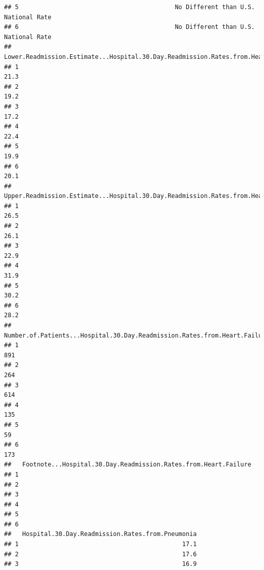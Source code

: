 \documentclass[
]{article}
\begin{document}
\begin{verbatim}
## 5                                           No Different than U.S. National Rate
## 6                                           No Different than U.S. National Rate
##   Lower.Readmission.Estimate...Hospital.30.Day.Readmission.Rates.from.Heart.Failure
## 1                                                                              21.3
## 2                                                                              19.2
## 3                                                                              17.2
## 4                                                                              22.4
## 5                                                                              19.9
## 6                                                                              20.1
##   Upper.Readmission.Estimate...Hospital.30.Day.Readmission.Rates.from.Heart.Failure
## 1                                                                              26.5
## 2                                                                              26.1
## 3                                                                              22.9
## 4                                                                              31.9
## 5                                                                              30.2
## 6                                                                              28.2
##   Number.of.Patients...Hospital.30.Day.Readmission.Rates.from.Heart.Failure
## 1                                                                       891
## 2                                                                       264
## 3                                                                       614
## 4                                                                       135
## 5                                                                        59
## 6                                                                       173
##   Footnote...Hospital.30.Day.Readmission.Rates.from.Heart.Failure
## 1                                                                
## 2                                                                
## 3                                                                
## 4                                                                
## 5                                                                
## 6                                                                
##   Hospital.30.Day.Readmission.Rates.from.Pneumonia
## 1                                             17.1
## 2                                             17.6
## 3                                             16.9

\end{verbatim}
\end{document}
